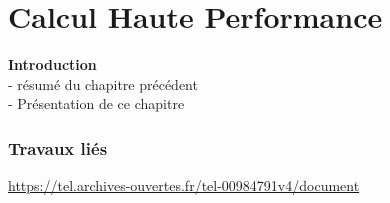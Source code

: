 \chapter{Calcul Haute Performance}\label{chap:hpc}
\minitoc

\textbf{Introduction}\\
- résumé du chapitre précédent\\
- Présentation de ce chapitre\\




\newpage



\newpage



\newpage



\newpage

%

\newpage





\printbibliography[heading=references,segment=\therefsegment]

\subsection{Travaux liés}
\url{https://tel.archives-ouvertes.fr/tel-00984791v4/document}

